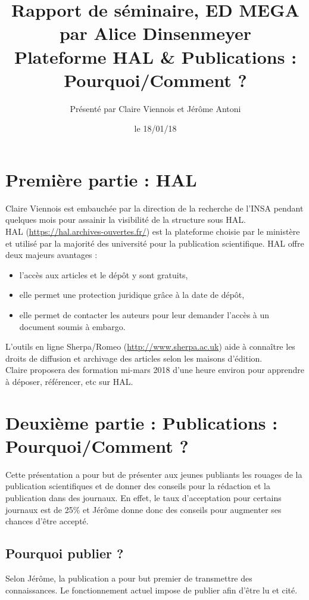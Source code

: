 \documentclass[12pt]{article}
\title{ {\fontsize{14pt}{14pt}\selectfont Rapport de séminaire, ED MEGA par Alice Dinsenmeyer} \\[1cm]
\fontsize{18pt}{18pt}\selectfont\textbf{Plateforme HAL \& Publications : Pourquoi/Comment ?}} %
\author{
\large{Présenté par Claire Viennois et Jérôme Antoni}\\%
\vspace{-5mm}
}
\date{le 18/01/18}
\begin{document}
\maketitle

\section{Première partie : HAL}
Claire Viennois est embauchée par la direction de la recherche de l'INSA pendant quelques mois pour assainir la visibilité de la structure sous HAL.\\
HAL (\url{https://hal.archives-ouvertes.fr/}) est la plateforme choisie par le ministère et utilisé par la majorité des université pour la publication scientifique. HAL offre deux majeurs avantages : 
\begin{itemize}
    \item l'accès aux articles et le dépôt y sont gratuits,
    \item elle permet une protection juridique grâce à la date de dépôt,
    \item elle permet de contacter les auteurs pour leur demander l'accès à un document soumis à embargo.
\end{itemize}

L'outils en ligne Sherpa/Romeo (\url{http://www.sherpa.ac.uk}) aide à connaître les droits de diffusion et archivage des articles selon les maisons d'édition.\\
Claire proposera des formation mi-mars 2018 d'une heure environ pour apprendre à déposer, référencer, etc sur HAL.

\section{Deuxième partie :  Publications : Pourquoi/Comment ?}
Cette présentation a pour but de présenter aux jeunes publiants les rouages de la publication scientifiques et de donner des conseils pour la rédaction et la publication dans des journaux. En effet, le taux d'acceptation pour certains journaux est de 25\% et Jérôme donne donc des conseils pour augmenter ses chances d'être accepté.

\subsection{Pourquoi publier ?}
Selon Jérôme, la publication a pour but premier de transmettre des connaissances. Le fonctionnement actuel impose de publier afin d'être lu et cité. 
\end{document}
